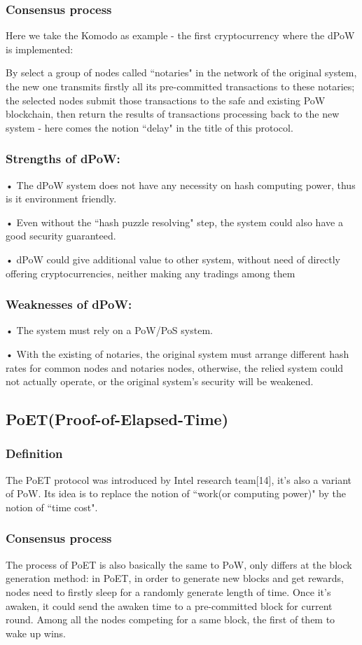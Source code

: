 \documentclass[doublespacing]{bmcart}
\begin{document}
\begin{CJK*}{UTF8}{gbsn}
    \subsubsection*{Consensus process}
    Here we take the Komodo as example - the first cryptocurrency where the dPoW is implemented:
	\par By select a group of nodes called ``notaries" in the network of the original system, the new one transmits firstly all its pre-committed transactions to these notaries;	the selected nodes submit those transactions to the safe and existing PoW blockchain, then return the results of transactions processing back to the new system - here comes the notion ``delay" in the title of this protocol.
	\subsubsection*{Strengths of dPoW:}		
    • The dPoW system does not have any necessity on hash computing power, thus is it environment friendly.
    \par • Even without the ``hash puzzle resolving" step, the system could also have a good security guaranteed.
    \par • dPoW could give additional value to other system, without need of directly offering cryptocurrencies, neither making any tradings among them
	\subsubsection*{Weaknesses of dPoW:}	
    • The system must rely on a PoW/PoS system.
    \par • With the existing of notaries, the original system must arrange different hash rates for common nodes and notaries nodes, otherwise, the relied system could not actually operate, or the original system’s security will be weakened.
    
    \subsection{ PoET(Proof-of-Elapsed-Time)} 
\subsubsection*{Definition} 
The PoET protocol was introduced by Intel research team[14], it’s also a variant of PoW. Its idea is to replace the notion of ``work(or computing power)" by the notion of ``time cost".
	\subsubsection*{Consensus process}
	The process of PoET is also basically the same to PoW, only differs at the block generation method: in PoET, in order to generate new blocks and get rewards, nodes need to firstly sleep for a randomly generate length of time. Once it’s awaken, it could send the awaken time to a pre-committed block for current round. Among all the nodes competing for a same block, the first of them to wake up wins.

\end{CJK*}
\end{document}
